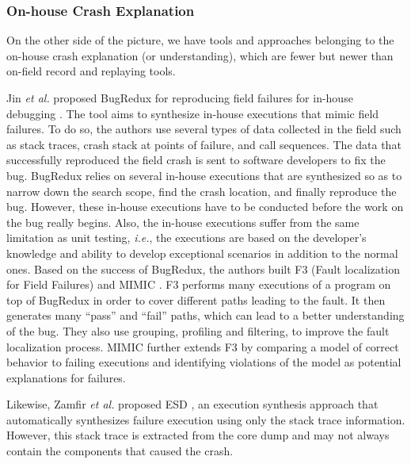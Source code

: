 \subsubsection{On-house Crash Explanation}

On the other side of the picture, we have tools and approaches belonging to the on-house crash explanation  (or understanding), which are fewer but newer than on-field record and replaying tools.

Jin {\it et al.} proposed BugRedux for reproducing field failures for in-house debugging \cite{Jin2012}.
The tool aims to synthesize in-house executions that mimic field failures.
To do so, the authors use several types of data collected in the field such as stack traces, crash stack at points of failure, and call sequences.
The data that successfully reproduced the field crash is sent to software developers to fix the bug.
BugRedux relies on several in-house executions that are synthesized so as to narrow down the search scope,  find the crash location, and finally reproduce the bug.
However, these in-house executions have to be conducted before the work on the bug really begins.
Also, the in-house executions suffer from the same limitation as unit testing, {\it i.e.}, the executions are based on the developer's knowledge and ability to develop exceptional scenarios in addition to the normal ones.
Based on the success of BugRedux, the authors built F3 (Fault
localization for Field Failures) \cite{Jin2013} and MIMIC \cite{Zuddas2014}.
F3 performs many executions of a program on top of BugRedux in order to cover different paths leading to the fault.
It then generates many ``pass'' and ``fail'' paths, which can lead to a better understanding of the bug.
They also use grouping, profiling and filtering, to improve the fault localization process.
MIMIC further extends F3 by comparing a model of correct behavior to failing executions and identifying violations of the model as potential explanations for failures.

Likewise, Zamfir {\it et al.} proposed ESD \cite{Zamfir2010}, an execution synthesis approach that automatically synthesizes failure execution using only the stack trace information. However, this stack trace is extracted from the core dump and may not always contain the components that caused the crash.

